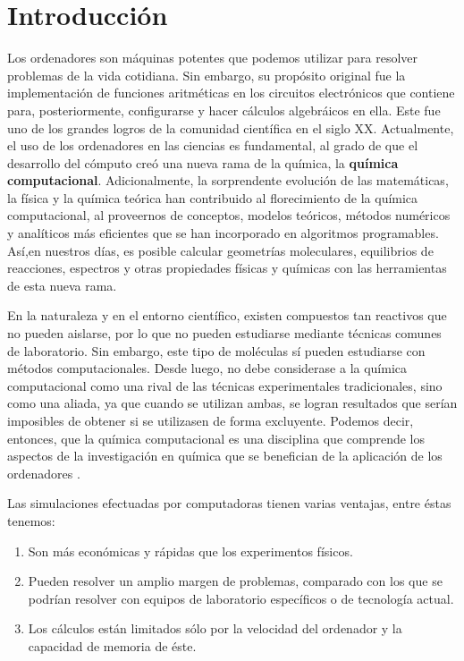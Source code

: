 \documentclass[12pt]{article}
\begin{document}
\newpage

\pagestyle{plain} 

\section*{Introducción}
Los ordenadores son máquinas potentes que podemos utilizar para resolver problemas de la vida
cotidiana. Sin embargo, su propósito original fue la implementación de funciones aritméticas
en los circuitos electrónicos que contiene para, posteriormente, configurarse y hacer cálculos
algebráicos en ella. Este fue uno de los grandes logros de la comunidad científica en el siglo XX.
Actualmente, el uso de los ordenadores en las ciencias es fundamental, al grado de que el desarrollo
del cómputo creó una nueva rama de la química, la \textbf{química computacional}.
Adicionalmente, la sorprendente evolución de las matemáticas, la física y la química teórica han contribuido al florecimiento de la química computacional, al proveernos de conceptos, modelos
teóricos, métodos numéricos y analíticos más eficientes que se han incorporado en algoritmos
programables. Así,en nuestros días, es posible calcular geometrías moleculares, equilibrios de
reacciones, espectros y otras propiedades físicas y químicas con las herramientas de esta nueva
rama. 

En la naturaleza y en el entorno científico, existen compuestos tan reactivos que no pueden
aislarse, por lo que no pueden estudiarse mediante técnicas comunes de laboratorio. Sin embargo, este tipo de moléculas sí pueden estudiarse con métodos computacionales. Desde luego, no debe considerase a la química computacional como una rival de las técnicas experimentales tradicionales, sino como
una aliada, ya que cuando se utilizan ambas, se logran resultados que serían imposibles de obtener si se utilizasen de forma excluyente. Podemos decir, entonces, que la química computacional es una disciplina que comprende los aspectos de la investigación en química que se benefician de la aplicación de los ordenadores \cite{Cuevas2003}.

Las simulaciones efectuadas por computadoras tienen varias ventajas, entre éstas tenemos:
\begin{enumerate}
\item Son más económicas y rápidas que los experimentos físicos.
\item Pueden resolver un amplio margen de problemas, comparado con los que se podrían resolver con equipos de laboratorio específicos o de tecnología actual. 
\item Los cálculos están limitados sólo por la velocidad del ordenador y la capacidad de memoria de éste.
\end{enumerate}
\end{document}
